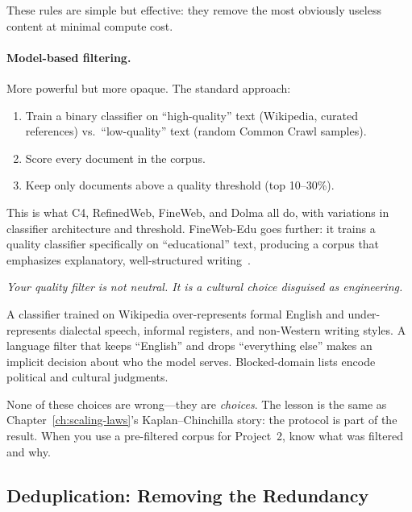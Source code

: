 These rules are simple but effective: they remove the most obviously useless content at minimal compute cost.

\paragraph{Model-based filtering.} More powerful but more opaque. The standard approach:

\begin{enumerate}[nosep]
  \item Train a binary classifier on ``high-quality'' text (Wikipedia, curated references) vs.\ ``low-quality'' text (random Common Crawl samples).
  \item Score every document in the corpus.
  \item Keep only documents above a quality threshold (top 10--30\%).
\end{enumerate}

This is what C4, RefinedWeb, FineWeb, and Dolma all do, with variations in classifier architecture and threshold. FineWeb-Edu goes further: it trains a quality classifier specifically on ``educational'' text, producing a corpus that emphasizes explanatory, well-structured writing~\cite{penedo2024fineweb}.

\begin{tcolorbox}[colback=gray!5, colframe=gray!40, title=\textbf{The Hidden Choice in Filtering}]
\emph{Your quality filter is not neutral. It is a cultural choice disguised as engineering.}

A classifier trained on Wikipedia over-represents formal English and under-represents dialectal speech, informal registers, and non-Western writing styles. A language filter that keeps ``English'' and drops ``everything else'' makes an implicit decision about who the model serves. Blocked-domain lists encode political and cultural judgments.

None of these choices are wrong---they are \emph{choices}. The lesson is the same as Chapter~\ref{ch:scaling-laws}'s Kaplan--Chinchilla story: the protocol is part of the result. When you use a pre-filtered corpus for Project~2, know what was filtered and why.
\end{tcolorbox}


\subsection{Deduplication: Removing the Redundancy}
\label{sec:dedup}

